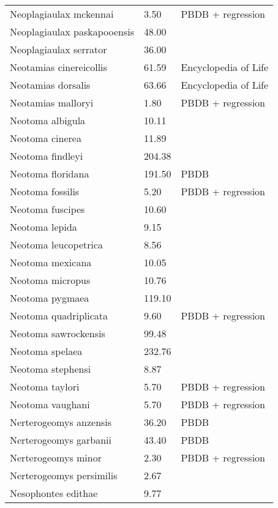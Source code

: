 \begin{longtable}{p{} p{} p{}}
    Neoplagiaulax mckennai & 3.50 & PBDB + regression \\ 
    Neoplagiaulax paskapooensis & 48.00 & \cite{Wilson2012} \\ 
    Neoplagiaulax serrator & 36.00 & \cite{Wilson2012} \\ 
    Neotamias cinereicollis & 61.59 & Encyclopedia of Life \\ 
    Neotamias dorsalis & 63.66 & Encyclopedia of Life \\ 
    Neotamias malloryi & 1.80 & PBDB + regression \\ 
    Neotoma albigula & 10.11 & \cite{Smith2004} \\ 
    Neotoma cinerea & 11.89 & \cite{Smith2004} \\ 
    Neotoma findleyi & 204.38 & \cite{Tomiya2013} \\ 
    Neotoma floridana & 191.50 & PBDB \\ 
    Neotoma fossilis & 5.20 & PBDB + regression \\ 
    Neotoma fuscipes & 10.60 & \cite{Smith2004} \\ 
    Neotoma lepida & 9.15 & \cite{Smith2004} \\ 
    Neotoma leucopetrica & 8.56 & \cite{Grohe2010} \\ 
    Neotoma mexicana & 10.05 & \cite{Smith2004} \\ 
    Neotoma micropus & 10.76 & \cite{Smith2004} \\ 
    Neotoma pygmaea & 119.10 & \cite{Tomiya2013} \\ 
    Neotoma quadriplicata & 9.60 & PBDB + regression \\ 
    Neotoma sawrockensis & 99.48 & \cite{Tomiya2013} \\ 
    Neotoma spelaea & 232.76 & \cite{Tomiya2013} \\ 
    Neotoma stephensi & 8.87 & \cite{Smith2004} \\ 
    Neotoma taylori & 5.70 & PBDB + regression \\ 
    Neotoma vaughani & 5.70 & PBDB + regression \\ 
    Nerterogeomys anzensis & 36.20 & PBDB \\ 
    Nerterogeomys garbanii & 43.40 & PBDB \\ 
    Nerterogeomys minor & 2.30 & PBDB + regression \\ 
    Nerterogeomys persimilis & 2.67 & \cite{Grohe2010} \\ 
    Nesophontes edithae & 9.77 & \cite{Smith2004} \\ 

\end{longtable}
